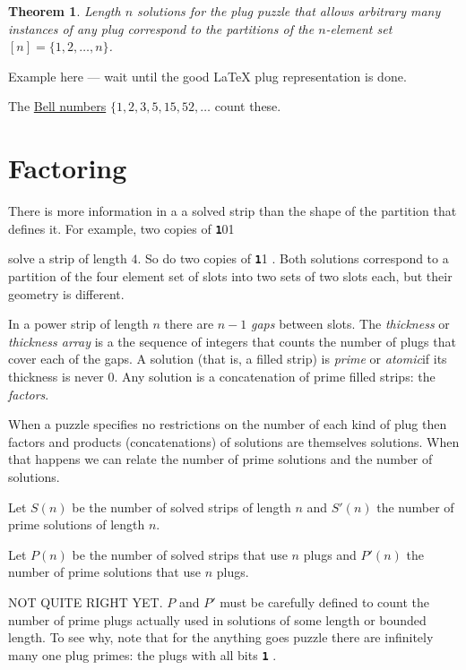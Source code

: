 \documentclass[10pt]{article}
\newtheorem{theorem}{Theorem}
\numberwithin{equation}{section}
\newenvironment{anote}
               {{\textcolor{blue}{Note:}}
                 \itshape
               }
               {}
\newcommand{\plug}[1]{%
\mbox{{\textbf\texttt #1}}
}
\begin{document}
\begin{theorem} Length $n$ solutions for the plug
  puzzle that allows arbitrary many instances of any plug
correspond to the partitions of the   $n$-element set $[n] = \{1,2,
\ldots, n \}$. 
\end{theorem}

\begin{anote}
Example here --- wait until the good \LaTeX{} plug representation
  is done.
\end{anote}

The \href{https://en.wikipedia.org/wiki/Bell_number}{Bell numbers}
$\{1, 2, 3, 5, 15, 52, \ldots$  count these.

\section{Factoring}

There is more information in a a solved  strip than the shape of
the partition that defines it. For example, two copies of \plug{101}
solve a strip of length $4$. So do two copies of \plug{11}. Both solutions correspond to a partition of the four element set of slots
into two sets of two slots each, but their geometry is different.

In a  power strip of length $n$ there are $n-1$ \emph{gaps} between
slots. The \emph{thickness} or \emph{thickness array} is a the
sequence of integers that counts the number of plugs that cover each
of the gaps. A solution (that is, a filled strip) is \emph{prime} or \emph{atomic}if
its thickness is never $0$. Any solution is a concatenation of prime
filled strips: the \emph{factors}.

When a puzzle specifies no restrictions on the number of each kind of plug then factors and products (concatenations) of solutions are themselves solutions.  When that  happens we can relate the number of prime solutions and the number of solutions.

Let   $S(n)$ be the number of solved strips of length $n$ and
 $S'(n)$ the number of prime solutions of length $n$. 
 
Let $P(n)$  be the number of solved strips that use $n$ plugs and
  $P'(n)$ the number of prime solutions that use $n$ plugs.

NOT QUITE RIGHT YET.  $P$ and $P'$ must be carefully defined to count the number of prime plugs actually used in solutions of some length or bounded length. To see why, note that for the anything goes puzzle there are infinitely many one plug primes: the plugs with all bits \plug{1}.
\end{document}
